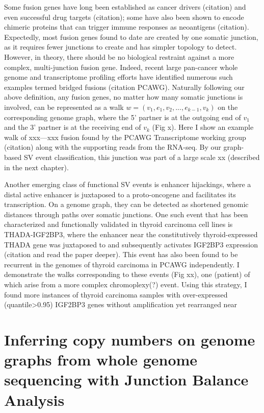 \documentclass[phd,tocprelim]{cornell}
\begin{document}
Some fusion genes have long been established as cancer drivers (citation) and even successful drug targets (citation); some have also been shown to encode chimeric proteins that can trigger immune responses as neoantigens (citation). Expectedly, most fusion genes found to date are created by one somatic junction, as it requires fewer junctions to create and has simpler topology to detect. However, in theory, there should be no biological restraint against a more complex, multi-junction fusion gene. Indeed, recent large pan-cancer whole genome and transcriptome profiling efforts have identified numerous such examples termed bridged fusions (citation PCAWG). Naturally following our above definition, any fusion genes, no matter how many somatic junctions is involved, can be represented as a walk $w = (v_1, e_1, v_2, ..., e_{k-1}, v_k)$ on the corresponding genome graph, where the 5’ partner is at the outgoing end of $v_1$ and the 3’ partner is at the receiving end of $v_k$ (Fig x). Here I show an example walk of xxx—xxx fusion found by the PCAWG Transcriptome working group (citation) along with the supporting reads from the RNA-seq. By our graph-based SV event classification, this junction was part of a large scale xx (described in the next chapter).

Another emerging class of functional SV events is enhancer hijackings, where a distal active enhancer is juxtaposed to a proto-oncogene and facilitates its transcription. On a genome graph, they can be detected as shortened genomic distances through paths over somatic junctions. One such event that has been characterized and functionally validated in thyroid carcinoma cell lines is THADA-IGF2BP3, where the enhancer near the constitutively thyroid-expressed THADA gene was juxtaposed to and subsequently activates IGF2BP3 expression (citation and read the paper deeper). This event has also been found to be recurrent in the genomes of thyroid carcinoma in PCAWG independently. I demonstrate the walks corresponding to these events (Fig xx), one (patient) of which arise from a more complex chromoplexy(?) event. Using this strategy, I found more instances of thyroid carcinoma samples with over-expressed (quantile>0.95) IGF2BP3 genes without amplification yet rearranged near 

\section{Inferring copy numbers on genome graphs from whole genome sequencing with Junction Balance Analysis}
\end{document}
